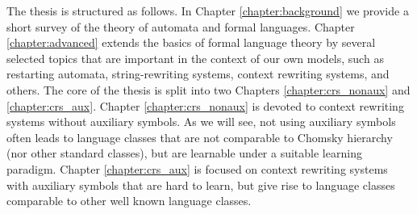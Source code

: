 The thesis is structured as follows. In Chapter \ref{chapter:background} we provide a short survey of the theory of automata and formal languages. Chapter \ref{chapter:advanced} extends the basics of formal language theory by several selected topics that are important in the context of our own models, such as restarting automata, string-rewriting systems, context rewriting systems, and others. The core of the thesis is split into two Chapters \ref{chapter:crs_nonaux} and \ref{chapter:crs_aux}. Chapter \ref{chapter:crs_nonaux} is devoted to context rewriting systems without auxiliary symbols. As we will see, not using auxiliary symbols often leads to language classes that are not comparable to Chomsky hierarchy (nor other standard classes), but are learnable under a suitable learning paradigm. Chapter \ref{chapter:crs_aux} is focused on context rewriting systems with auxiliary symbols that are hard to learn, but give rise to language classes comparable to other well known language classes.
